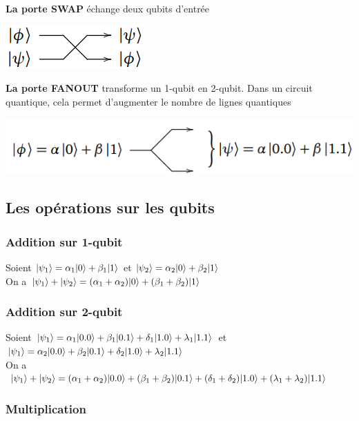 \documentclass[12pt,openany]{report}
\DeclarePairedDelimiter\ket{\lvert}{\rangle}
\begin{document}
\textbf{La porte SWAP} échange deux qubits d'entrée
\begin{center}
\includegraphics[scale=1]{./swap}
\end{center}

\textbf{La porte FANOUT} transforme un 1-qubit en 2-qubit. Dans un circuit quantique, cela permet d'augmenter le nombre de lignes quantiques
\begin{center}
\includegraphics[scale=1]{./fanout}
\end{center}
\subsection{Les opérations sur les qubits}
\subsubsection{Addition sur 1-qubit}
Soient $\ket{\psi_1}=\alpha_1 \ket{0}+ \beta_1 \ket{1}   $ et $\ket{\psi_2}=\alpha_2 \ket{0}+ \beta_2 \ket{1}   $\\
On a $\ket{\psi_1} +  \ket{\psi_2}= (\alpha_1 + \alpha_2)\ket{0}+ (\beta_1 + \beta_2)\ket{1}   $

\subsubsection{Addition sur 2-qubit}

Soient $\ket{\psi_1}=\alpha_1 \ket{0.0}+ \beta_1 \ket{0.1}+ \delta_1\ket{1.0} + \lambda_1 \ket{1.1}  $ et$\ket{\psi_1}=\alpha_2 \ket{0.0}+ \beta_2 \ket{0.1}+ \delta_2\ket{1.0} + \lambda_2 \ket{1.1}  $\\
On a $\ket{\psi_1} +  \ket{\psi_2}= (\alpha_1 + \alpha_2)\ket{0.0}+ (\beta_1 + \beta_2)\ket{0.1} + (\delta_1 + \delta_2)\ket{1.0} + (\lambda_1 + \lambda_2)\ket{1.1} $

\subsubsection{Multiplication}
\end{document}
